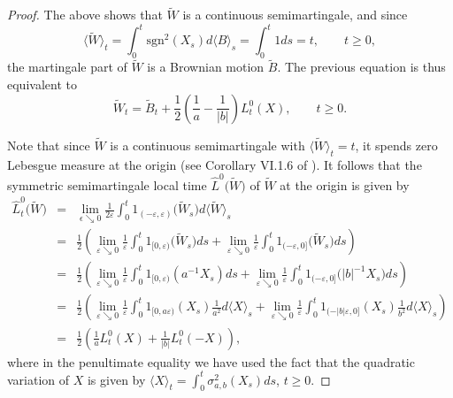 \documentclass[reqno]{amsart}
\theoremstyle{definition}
\theoremstyle{remark}
\numberwithin{equation}{section}
\begin{document}
\begin{proof}
The above shows that $\widetilde{W}$ is a continuous semimartingale, and since
$$\big\langle \widetilde{W}\big\rangle_t=\int_0^t \mathrm{sgn}^2(X_s) d\langle B\rangle_s =\int_0^t 1 ds=t, \qquad t\ge 0,$$
the martingale part of $\widetilde{W}$ is a Brownian motion $\widetilde{B}$. The previous equation is thus equivalent to
\begin{equation}\label{representation of tilde W}
\widetilde{W}_t=\widetilde{B}_t+\frac12\left( \frac{1}{a}-\frac{1}{\vert b\vert}\right) L_t^0(X), \qquad t \ge 0.
\end{equation}

Note that since $\widetilde{W}$ is a continuous semimartingale with $\langle \widetilde{W}\rangle_t =t$, it spends zero Lebesgue measure at the origin (see Corollary VI.1.6 of \cite{Revuz and Yor}). It follows that the symmetric semimartingale local time $\widehat{L}^0\big(\widetilde{W}\big)$ of $\widetilde{W}$ at the origin is given by
\begin{eqnarray*}
\widehat{L}_t^0\big(\widetilde{W}\big)&=&\lim_{\epsilon \searrow 0} \frac{1}{2\varepsilon}\int_0^t 1_{(-\varepsilon,\varepsilon)}\big(\widetilde{W}_s\big) d \big\langle \widetilde{W}\big\rangle_s\\
&=&\frac12 \left( \lim_{\varepsilon \searrow 0} \frac{1}{\varepsilon}\int_0^t 1_{[0,\varepsilon)}\big(\widetilde{W}_s\big) ds +\lim_{\varepsilon \searrow 0} \frac{1}{\varepsilon}\int_0^t 1_{(-\varepsilon,0]}\big(\widetilde{W}_s\big) ds\right)\\
&=&\frac12 \left( \lim_{\varepsilon \searrow 0} \frac{1}{\varepsilon}\int_0^t 1_{[0,\varepsilon)}\left(a^{-1} X_s\right) ds +\lim_{\varepsilon \searrow 0} \frac{1}{\varepsilon}\int_0^t 1_{(-\varepsilon,0]}\big({\vert b\vert}^{-1} X_s\big) ds\right)\\
&=&\frac12 \left(\lim_{\varepsilon \searrow 0} \frac{1}{\varepsilon}\int_0^t 1_{[0,a\varepsilon)}\left(X_s\right) \frac1{a^2}d\langle X \rangle_s +\lim_{\varepsilon \searrow 0} \frac{1}{\varepsilon}\int_0^t 1_{(-\vert b\vert\varepsilon,0]}\left( X_s\right) \frac{1}{b^2}d\langle X \rangle_s\right)\\
&=&\frac12\left(\frac1a{L}_t^0(X)+\frac{1}{\vert b \vert} {L}_t^0(-X)\right),
\end{eqnarray*}
where in the penultimate equality we have used the fact that the quadratic variation of $X$ is given by $\langle X\rangle_t=\int_0^t \sigma_{a,b}^2 (X_s) ds$, $t\ge 0$.


\end{proof}
\end{document}
